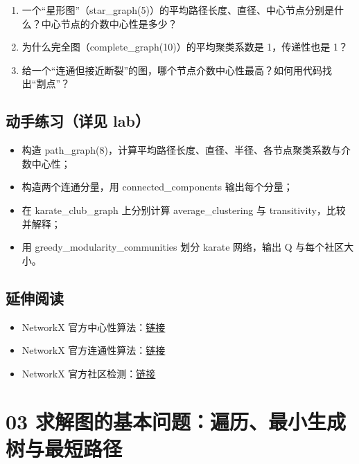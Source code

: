 \begin{enumerate}
\def\labelenumi{\arabic{enumi}.}
\tightlist
\item
  一个``星形图''（star\_graph(5)）的平均路径长度、直径、中心节点分别是什么？中心节点的介数中心性是多少？
\item
  为什么完全图（complete\_graph(10)）的平均聚类系数是 1，传递性也是 1？
\item
  给一个``连通但接近断裂''的图，哪个节点介数中心性最高？如何用代码找出``割点''？
\end{enumerate}

\subsection{动手练习（详见
lab）}\label{ux52a8ux624bux7ec3ux4e60ux8be6ux89c1-lab-12}

\begin{itemize}
\tightlist
\item
  构造
  path\_graph(8)，计算平均路径长度、直径、半径、各节点聚类系数与介数中心性；
\item
  构造两个连通分量，用 connected\_components 输出每个分量；
\item
  在 karate\_club\_graph 上分别计算 average\_clustering 与
  transitivity，比较并解释；
\item
  用 greedy\_modularity\_communities 划分 karate 网络，输出 Q
  与每个社区大小。
\end{itemize}

\subsection{延伸阅读}\label{ux5ef6ux4f38ux9605ux8bfb-27}

\begin{itemize}
\tightlist
\item
  NetworkX
  官方中心性算法：\href{https://networkx.org/documentation/stable/reference/algorithms/centrality.html}{链接}
\item
  NetworkX
  官方连通性算法：\href{https://networkx.org/documentation/stable/reference/algorithms/connectivity.html}{链接}
\item
  NetworkX
  官方社区检测：\href{https://networkx.org/documentation/stable/reference/algorithms/community.html}{链接}
\end{itemize}

\section{03
求解图的基本问题：遍历、最小生成树与最短路径}\label{ux6c42ux89e3ux56feux7684ux57faux672cux95eeux9898ux904dux5386ux6700ux5c0fux751fux6210ux6811ux4e0eux6700ux77edux8defux5f84}

